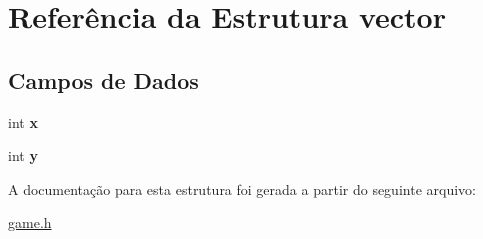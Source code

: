 \hypertarget{structvector}{
\section{Referência da Estrutura vector}
\label{structvector}
}
\subsection*{Campos de Dados}
\begin{DoxyCompactItemize}
\item 
\hypertarget{structvector_a6150e0515f7202e2fb518f7206ed97dc}{
int {\bfseries x}}
\label{structvector_a6150e0515f7202e2fb518f7206ed97dc}

\item 
\hypertarget{structvector_a0a2f84ed7838f07779ae24c5a9086d33}{
int {\bfseries y}}
\label{structvector_a0a2f84ed7838f07779ae24c5a9086d33}

\end{DoxyCompactItemize}


A documentação para esta estrutura foi gerada a partir do seguinte arquivo:\begin{DoxyCompactItemize}
\item 
\hyperlink{game_8h}{game.h}\end{DoxyCompactItemize}
